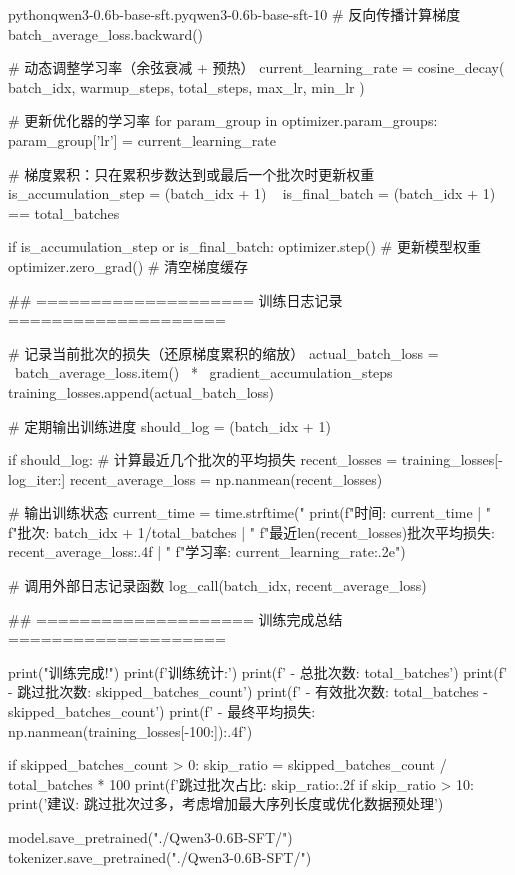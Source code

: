 \documentclass[lang=cn,newtx,10pt,scheme=chinese]{elegantbook}
\begin{document}
\begin{codebox}{python}{qwen3-0.6b-base-sft.py}{qwen3-0.6b-base-sft-10}
    # 反向传播计算梯度
    batch_average_loss.backward()

    # 动态调整学习率（余弦衰减 + 预热）
    current_learning_rate = cosine_decay(
        batch_idx,
        warmup_steps,
        total_steps,
        max_lr,
        min_lr
    )
    
    # 更新优化器的学习率
    for param_group in optimizer.param_groups:
        param_group['lr'] = current_learning_rate

    # 梯度累积：只在累积步数达到或最后一个批次时更新权重
    is_accumulation_step = (batch_idx + 1) \
    is_final_batch = (batch_idx + 1) == total_batches
    
    if is_accumulation_step or is_final_batch:
        optimizer.step()        # 更新模型权重
        optimizer.zero_grad()   # 清空梯度缓存

    ## ==================== 训练日志记录 ====================
    
    # 记录当前批次的损失（还原梯度累积的缩放）
    actual_batch_loss =                   \
        batch_average_loss.item()         \
        *                                 \
        gradient_accumulation_steps
    training_losses.append(actual_batch_loss)

    # 定期输出训练进度
    should_log = (batch_idx + 1) %
    
    if should_log:
        # 计算最近几个批次的平均损失
        recent_losses = training_losses[-log_iter:]
        recent_average_loss = np.nanmean(recent_losses)
        
        # 输出训练状态
        current_time = time.strftime("%
        print(f"时间: {current_time} | "
              f"批次: {batch_idx + 1}/{total_batches} | "
              f"最近{len(recent_losses)}批次平均损失: {recent_average_loss:.4f} | "
              f"学习率: {current_learning_rate:.2e}")
        
        # 调用外部日志记录函数
        log_call(batch_idx, recent_average_loss)

## ==================== 训练完成总结 ====================

print("训练完成!")
print(f'训练统计:')
print(f'   - 总批次数: {total_batches}')
print(f'   - 跳过批次数: {skipped_batches_count}')
print(f'   - 有效批次数: {total_batches - skipped_batches_count}')
print(f'   - 最终平均损失: {np.nanmean(training_losses[-100:]):.4f}')

if skipped_batches_count > 0:
    skip_ratio = skipped_batches_count / total_batches * 100
    print(f'跳过批次占比: {skip_ratio:.2f}%
    if skip_ratio > 10:
        print('建议: 跳过批次过多，考虑增加最大序列长度或优化数据预处理')

model.save_pretrained("./Qwen3-0.6B-SFT/")
tokenizer.save_pretrained("./Qwen3-0.6B-SFT/")
\end{codebox}
\end{document}
